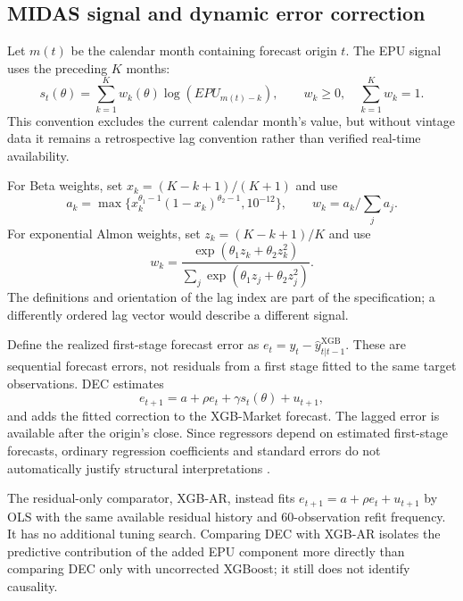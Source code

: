 \subsection{MIDAS signal and dynamic error correction}
Let $m(t)$ be the calendar month containing forecast origin $t$. The EPU signal uses the preceding $K$ months:
\begin{equation}
s_t(\theta)=\sum_{k=1}^{K}w_k(\theta)\log(EPU_{m(t)-k}),
\qquad w_k\geq0,\quad\sum_{k=1}^K w_k=1.
\end{equation}
This convention excludes the current calendar month's value, but without vintage data it remains a retrospective lag convention rather than verified real-time availability.

For Beta weights, set $x_k=(K-k+1)/(K+1)$ and use
\begin{equation}
a_k=\max\{x_k^{\theta_1-1}(1-x_k)^{\theta_2-1},10^{-12}\},
\qquad w_k=a_k/\textstyle\sum_j a_j.
\end{equation}
For exponential Almon weights, set $z_k=(K-k+1)/K$ and use
\begin{equation}
w_k=\frac{\exp(\theta_1z_k+\theta_2z_k^2)}
{\sum_j\exp(\theta_1z_j+\theta_2z_j^2)}.
\end{equation}
The definitions and orientation of the lag index are part of the specification; a differently ordered lag vector would describe a different signal.

Define the realized first-stage forecast error as $e_t=y_t-\widehat y^{\mathrm{XGB}}_{t|t-1}$. These are sequential forecast errors, not residuals from a first stage fitted to the same target observations. DEC estimates
\begin{equation}
e_{t+1}=a+\rho e_t+\gamma s_t(\theta)+u_{t+1},
\label{eq:error_correction}
\end{equation}
and adds the fitted correction to the XGB-Market forecast. The lagged error is available after the origin's close. Since regressors depend on estimated first-stage forecasts, ordinary regression coefficients and standard errors do not automatically justify structural interpretations \citep{Pagan1984}.

The residual-only comparator, XGB-AR, instead fits $e_{t+1}=a+\rho e_t+u_{t+1}$ by OLS with the same available residual history and 60-observation refit frequency. It has no additional tuning search. Comparing DEC with XGB-AR isolates the predictive contribution of the added EPU component more directly than comparing DEC only with uncorrected XGBoost; it still does not identify causality.

